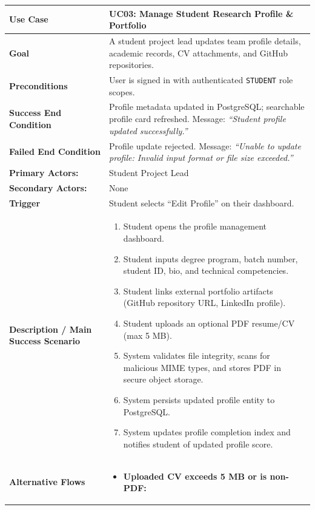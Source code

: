 \begin{table}[H]
\centering
\small
\begin{tabularx}{\textwidth}{|l|X|}
\hline
\rowcolor{lightgray!40} \textbf{Use Case} & \textbf{UC03: Manage Student Research Profile \& Portfolio} \\ \hline
\textbf{Goal} & A student project lead updates team profile details, academic records, CV attachments, and GitHub repositories. \\ \hline
\textbf{Preconditions} & User is signed in with authenticated \texttt{STUDENT} role scopes. \\ \hline
\textbf{Success End Condition} & Profile metadata updated in PostgreSQL; searchable profile card refreshed. Message: \textit{``Student profile updated successfully.''} \\ \hline
\textbf{Failed End Condition} & Profile update rejected. Message: \textit{``Unable to update profile: Invalid input format or file size exceeded.''} \\ \hline
\textbf{Primary Actors:} & Student Project Lead \\
\textbf{Secondary Actors:} & None \\ \hline
\textbf{Trigger} & Student selects ``Edit Profile'' on their dashboard. \\ \hline
\textbf{Description / Main Success Scenario} &
\begin{enumerate}[leftmargin=*]
    \item Student opens the profile management dashboard.
    \item Student inputs degree program, batch number, student ID, bio, and technical competencies.
    \item Student links external portfolio artifacts (GitHub repository URL, LinkedIn profile).
    \item Student uploads an optional PDF resume/CV (max 5 MB).
    \item System validates file integrity, scans for malicious MIME types, and stores PDF in secure object storage.
    \item System persists updated profile entity to PostgreSQL.
    \item System updates profile completion index and notifies student of updated profile score.
\end{enumerate} \\ \hline
\textbf{Alternative Flows} &
\begin{itemize}[leftmargin=*]
    \item[\textbf{4.a.}] \textbf{Uploaded CV exceeds 5 MB or is non-PDF:}

\end{itemize}
\end{tabularx}
\end{table}
